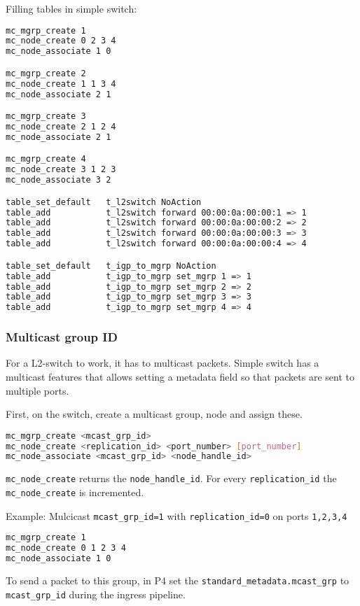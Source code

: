 \documentclass[a4paper, fontsize=8pt, landscape, DIV=1]{scrartcl}
\begin{document}
\begin{multicols*}{3}
  Filling tables in simple switch:

  \begin{lstlisting}[language=bash]mc_mgrp_create 1
mc_node_create 0 2 3 4
mc_node_associate 1 0

mc_mgrp_create 2
mc_node_create 1 1 3 4
mc_node_associate 2 1

mc_mgrp_create 3
mc_node_create 2 1 2 4
mc_node_associate 2 1

mc_mgrp_create 4
mc_node_create 3 1 2 3
mc_node_associate 3 2

table_set_default   t_l2switch NoAction
table_add           t_l2switch forward 00:00:0a:00:00:1 => 1
table_add           t_l2switch forward 00:00:0a:00:00:2 => 2
table_add           t_l2switch forward 00:00:0a:00:00:3 => 3
table_add           t_l2switch forward 00:00:0a:00:00:4 => 4

table_set_default   t_igp_to_mgrp NoAction
table_add           t_igp_to_mgrp set_mgrp 1 => 1
table_add           t_igp_to_mgrp set_mgrp 2 => 2
table_add           t_igp_to_mgrp set_mgrp 3 => 3
table_add           t_igp_to_mgrp set_mgrp 4 => 4\end{lstlisting}


  \subsubsection{Multicast group ID}
  For a L2-switch to work, it has to multicast packets. Simple switch has a multicast features that
  allows setting a metadata field so that packets are sent to multiple ports.

  First, on the switch, create a multicast group, node and assign these.
  \begin{lstlisting}[language=bash]
mc_mgrp_create <mcast_grp_id>
mc_node_create <replication_id> <port_number> [port_number]
mc_node_associate <mcast_grp_id> <node_handle_id>\end{lstlisting}
  
  \texttt{mc\_node\_create} returns the \texttt{node\_handle\_id}. For every \texttt{replication\_id} the \texttt{mc\_node\_create} is incremented.

  Example: Mulcicast \texttt{mcast\_grp\_id=1} with \texttt{replication\_id=0} on ports \texttt{1,2,3,4} 
  \begin{lstlisting}[language=bash]
mc_mgrp_create 1
mc_node_create 0 1 2 3 4
mc_node_associate 1 0\end{lstlisting}

  To send a packet to this group, in P4 set the \texttt{standard\_metadata.mcast\_grp} to \texttt{mcast\_grp\_id} during the ingress pipeline.


\end{multicols*}
\end{document}
